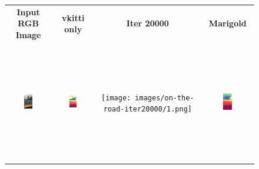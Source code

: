 \documentclass{article}
\begin{document}
\begin{figure}[H]
  \centering
  \begin{tabular}{cccc}
    \textbf{Input RGB Image} & \textbf{vkitti only} & \textbf{Iter 20000} & \textbf{Marigold} \\
    \includegraphics[width=0.2\textwidth,height=5.2cm,keepaspectratio]{images/on-the-road/1.jpg} &
    \includegraphics[width=0.2\textwidth,height=5.2cm,keepaspectratio]{images/real_image_trained/depth_colored/1.png} &
    \texttt{[image: images/on-the-road-iter20000/1.png]} &
    \includegraphics[width=0.2\textwidth,height=5.2cm,keepaspectratio]{images/real_image/depth_colored/1.png} \\


\end{tabular}
\end{figure}
\end{document}
